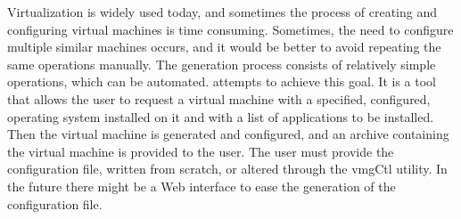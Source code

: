 
Virtualization is widely used today, and sometimes the process of creating and
configuring virtual machines is time consuming. Sometimes, the need to
configure multiple similar machines occurs, and it would be better to avoid
repeating the same operations manually. The generation process consists of
relatively simple operations, which can be automated. \project attempts to
achieve this goal. It is a tool that allows the user to request a virtual
machine with a specified, configured, operating system installed on it and with
a list of applications to be installed. Then the virtual machine is generated
and configured, and an archive containing the virtual machine is provided to
the user. The user must provide the configuration file, written from scratch,
or altered through the vmgCtl utility. In the future there might be a Web
interface to ease the generation of the configuration file.

